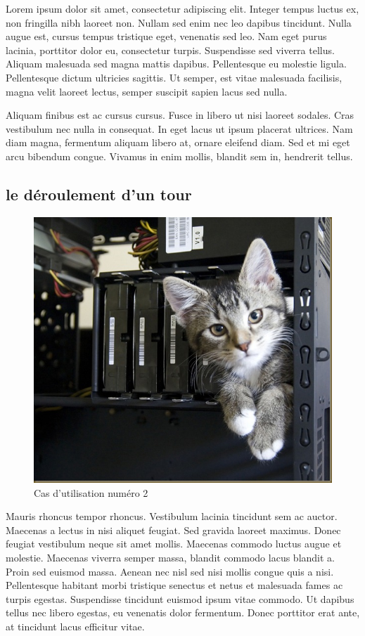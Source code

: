 	
		Lorem ipsum dolor sit amet, consectetur adipiscing elit. Integer tempus luctus ex, non fringilla nibh laoreet non. Nullam sed enim nec leo dapibus tincidunt. Nulla augue est, cursus tempus tristique eget, venenatis sed leo. Nam eget purus lacinia, porttitor dolor eu, consectetur turpis. Suspendisse sed viverra tellus. Aliquam malesuada sed magna mattis dapibus. Pellentesque eu molestie ligula. Pellentesque dictum ultricies sagittis. Ut semper, est vitae malesuada facilisis, magna velit laoreet lectus, semper suscipit sapien lacus sed nulla.

		Aliquam finibus est ac cursus cursus. Fusce in libero ut nisi laoreet sodales. Cras vestibulum nec nulla in consequat. In eget lacus ut ipsum placerat ultrices. Nam diam magna, fermentum aliquam libero at, ornare eleifend diam. Sed et mi eget arcu bibendum congue. Vivamus in enim mollis, blandit sem in, hendrerit tellus.


	\subsection{ le déroulement d'un tour }
		\begin{figure}
			\begin{center}
				\includegraphics[width=1\textwidth]{figure/cas_utilisation_2.jpg}
			\end{center}
			\caption{Cas d'utilisation numéro 2}
			\label{fig:use2}
		\end{figure}

		Mauris rhoncus tempor rhoncus. Vestibulum lacinia tincidunt sem ac auctor. Maecenas a lectus in nisi aliquet feugiat. Sed gravida laoreet maximus. Donec feugiat vestibulum neque sit amet mollis. Maecenas commodo luctus augue et molestie. Maecenas viverra semper massa, blandit commodo lacus blandit a. Proin sed euismod massa. Aenean nec nisl sed nisi mollis congue quis a nisi. Pellentesque habitant morbi tristique senectus et netus et malesuada fames ac turpis egestas. Suspendisse tincidunt euismod ipsum vitae commodo. Ut dapibus tellus nec libero egestas, eu venenatis dolor fermentum. Donec porttitor erat ante, at tincidunt lacus efficitur vitae.

